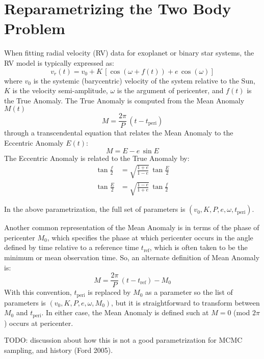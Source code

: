 \documentclass{article}
\begin{document}
\section{Reparametrizing the Two Body Problem}

When fitting radial velocity (RV) data for exoplanet or binary star systems, the
RV model is typically expressed as:
\begin{equation}
    v_r(t) = v_0 + K\,\left[\cos(\omega + f(t)) + e\,\cos(\omega)\right]
\end{equation}
where $v_0$ is the systemic (barycentric) velocity of the system relative to the
Sun, $K$ is the velocity semi-amplitude, $\omega$ is the argument of pericenter,
and $f(t)$ is the True Anomaly. The True Anomaly is computed from the Mean
Anomaly $M(t)$
\begin{equation}
    M = \frac{2\pi}{P} \, (t - t_{\mathrm{peri}})
\end{equation}
through a transcendental equation that relates the Mean Anomaly to the Eccentric
Anomaly $E(t)$:
\begin{equation}
    M = E - e\,\sin E
\end{equation}
The Eccentric Anomaly is related to the True Anomaly by:
$$
\begin{align}
    \tan\frac{f}{2} &= \sqrt{\frac{1+e}{1-e}} \, \tan\frac{E}{2} \\
    \tan\frac{E}{2} &= \sqrt{\frac{1-e}{1+e}} \, \tan\frac{f}{2}
\end{align}
$$

In the above parametrization, the full set of parameters is $(v_0, K, P, e,
\omega, t_{\mathrm{peri}})$.

Another common representation of the Mean Anomaly is in terms of the phase of
pericenter $M_0$, which specifies the phase at which pericenter occurs in the
angle defined by time relative to a reference time $t_{\mathrm{ref}}$, which is
often taken to be the minimum or mean observation time. So, an alternate
definition of Mean Anomaly is:
$$
    M = \frac{2\pi}{P} \, (t - t_{\mathrm{ref}}) - M_0
$$
With this convention, $t_{\mathrm{peri}}$ is replaced by $M_0$ as a parameter so
the list of parameters is $(v_0, K, P, e, \omega, M_0)$, but it is
straightforward to transform between $M_0$ and $t_{\mathrm{peri}}$. In either
case, the Mean Anomaly is defined such at $M=0$ (mod $2\pi$) occurs at
pericenter.

TODO: discussion about how this is not a good parametrization for MCMC sampling,
and history (Ford 2005).
\end{document}

